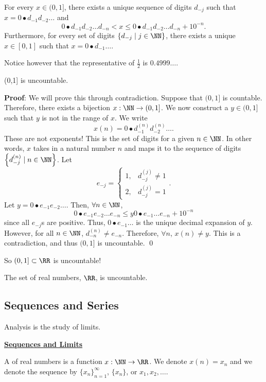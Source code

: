 \begin{theorem}
For every $x\in (0,1]$, there exists a unique sequence of digits $d_{-j}$ such that $x = 0\bullet d_{-1}d_{-2}\dots$ and 
\[
0\bullet d_{-1}d_{-2}\dots d_{-n} <x \leq 0\bullet d_{-1}d_{-2}\dots d_{-n} + 10^{-n}.
\]
Furthermore, for every set of digits $\{d_{-j}\mid j\in \NN\}$, there exists a unique $x\in [0,1]$ such that $x = 0\bullet d_{-1}\dots$.
\end{theorem}
Notice however that the representative of $\frac{1}{2}$ is $0.4999\dots$.

\begin{theorem}[Cantor]
(0,1] is uncountable.
\end{theorem}
\textbf{Proof}: We will prove this through contradiction. Suppose that $(0,1]$ is countable. Therefore, there exists a bijection $x:\NN \to (0,1]$. We now construct a $y\in (0,1]$ such that $y$ is not in the range of $x$. We write 
\[
x(n) = 0\bullet d_{-1}^{(n)} d_{-2}^{(n)}\dots.
\]
These are not exponents! This is the set of digits for a given $n\in \NN$. In other words, $x$ takes in a natural number $n$ and maps it to the sequence of digits $\left\{d_{-j}^{(n)} \mid n\in \NN\right\}$.
Let 
\[
e_{-j} = \begin{cases}
1, & d_{-j}^{(j)} \neq 1 \\
2, &d_{-j}^{(j)} = 1
\end{cases}.
\]
Let $y = 0\bullet e_{-1}e_{-2}\dots$. Then, $\forall n \in \NN$, \[
0\bullet e_{-1}e_{-2}\dots e_{-n}\leq y 0\bullet e_{-1}\dots e_{-n} + 10^{-n}
\]
since all $e_{-j}$s are positive. Thus, $0\bullet e_{-1}\dots$ is the unique decimal expansion of $y$. However, for all $n\in \NN$, $d_{-n}^{(n)} \neq e_{-n}$. Therefore, $\forall n$, $x(n) \neq y$. This is a contradiction, and thus $(0,1]$ is uncountable. \qed 

So $(0,1]\subset \RR$ is uncountable!
\begin{corollary}
The set of real numbers, $\RR$, is uncountable.
\end{corollary}

\subsection*{Sequences and Series}
\begin{remark}
Analysis is the study of limits.
\end{remark}
\noindent \underline{\textbf{Sequences and Limits}}

\begin{definition}
A  of real numbers is a function $x: \NN \to \RR$. We denote $x(n) = x_n$ and we denote the sequence by $\{x_n\}_{n=1}^\infty$, $\{x_n\}$, or $x_1,x_2,\dots$.
\end{definition}

